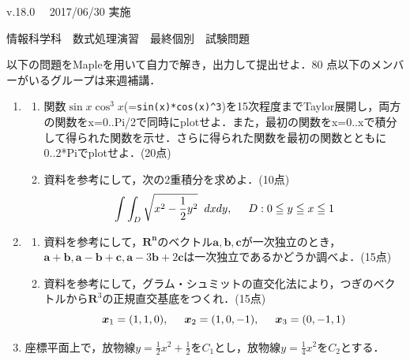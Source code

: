 \documentclass[12pt,a4j]{jarticle}
\begin{document}
\small{v.18.0}　
\hfill\small{2017/06/30 実施}
\begin{center}
{\gt\large{情報科学科　数式処理演習　最終個別　試験問題}}
\end{center}
\vspace{5mm}

以下の問題をMapleを用いて自力で解き，出力して提出せよ．80 点以下のメンバーがいるグループは来週補講．

\begin{enumerate}

\item 
\begin{enumerate}
\item 
関数$\sin x \cos^3 x$(=\verb|sin(x)*cos(x)^3|)を15次程度までTaylor展開し，両方の関数をx=0..Pi/2で同時にplotせよ．また，最初の関数をx=0..xで積分して得られた関数を示せ．さらに得られた関数を最初の関数とともに0..2*Piでplotせよ．(20点)

\item
資料を参考にして，次の2重積分を求めよ．(10点)
\begin{equation*}
\int \int_D \sqrt{x^2-\frac{1}{2}y^2}\hspace{2mm}dxdy,\hspace{5mm} D:0\leqq y \leqq x \leqq 1 
\end{equation*}

\end{enumerate}

\item 
\begin{enumerate}
\item 
資料を参考にして，$\boldsymbol{R^n}$のベクトル$\boldsymbol{a,b,c}$が一次独立のとき，$\boldsymbol{a}+\boldsymbol{b}, \boldsymbol{a}-\boldsymbol{b}+\boldsymbol{c}, \boldsymbol{a}-3\boldsymbol{b}+2\boldsymbol{c}$は一次独立であるかどうか調べよ．(15点)
\item
資料を参考にして，グラム・シュミットの直交化法により，つぎのベクトルから$\boldsymbol{R}^3$の正規直交基底をつくれ．(15点)
\begin{equation*}
\boldsymbol{x}_1 = (1,1,0), \hspace{5mm}
\boldsymbol{x}_2=(1,0,-1), \hspace{5mm}
\boldsymbol{x}_3=(0,-1,1)
\end{equation*}
\end{enumerate}


\item 
座標平面上で，放物線$\displaystyle y=\frac{1}{2}x^2+\frac{1}{2}$を$C_1$とし，放物線$\displaystyle y=\frac{1}{4}x^2$を$C_2$とする．


\end{enumerate}
\end{document}
